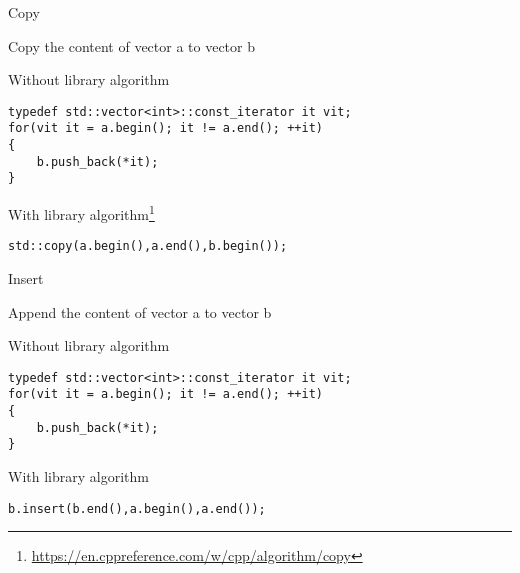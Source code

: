 \documentclass[12pt,t]{beamer}
\begin{document}
\begin{frame}[fragile]{Copy}
\begin{center}
Copy the content of vector a to vector b
\end{center}

\begin{block}{Without library algorithm}
\begin{lstlisting}
typedef std::vector<int>::const_iterator it vit; 
for(vit it = a.begin(); it != a.end(); ++it)
{
	b.push_back(*it);
}
\end{lstlisting}
\end{block}

\begin{block}{With library algorithm\footnote{\tiny\url{https://en.cppreference.com/w/cpp/algorithm/copy}}}
\begin{lstlisting}
std::copy(a.begin(),a.end(),b.begin());
\end{lstlisting}
\end{block}

\end{frame}

\begin{frame}[fragile]{Insert}
\begin{center}
Append the content of vector a to vector b
\end{center}

\begin{block}{Without library algorithm}
\begin{lstlisting}
typedef std::vector<int>::const_iterator it vit; 
for(vit it = a.begin(); it != a.end(); ++it)
{
	b.push_back(*it);
}
\end{lstlisting}
\end{block}

\begin{block}{With library algorithm}
\begin{lstlisting}
b.insert(b.end(),a.begin(),a.end());
\end{lstlisting}
\end{block}

\end{frame}
\end{document}
